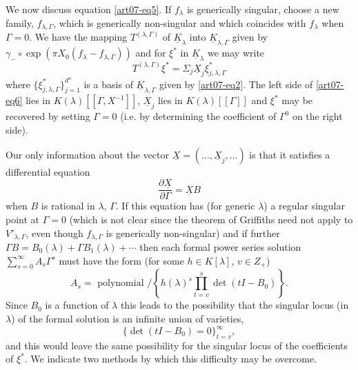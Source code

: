 We now discuss equation \eqref{art07-eq5}. If $f_{\lambda}$ is generically singular, choose a new family, $f_{\lambda,\Gamma}$, which is generically non-singular and which coincides with $f_{\lambda}$ when $\Gamma=0$. We have the mapping $T^{(\lambda,\Gamma)}$ of $\underline{K}_{\lambda}$ into $\underline{K}_{\lambda,\Gamma}$ given by $\gamma_{-}\circ \exp (\pi X_{0}(f_{\lambda}-f_{\lambda,\Gamma}))$ and for $\xi^{*}$ in $\underline{K}_{\lambda}$ we may write
\begin{equation*}
T^{(\lambda,\Gamma)}\xi^{*}=\Sigma_{j}\underline{X}_{j}\xi^{*}_{j,\lambda,\Gamma}\tag{7}\label{art07-eq7}
\end{equation*}
where $\{\xi^{*}_{j,\lambda,\Gamma}\}^{d^{n}}_{j=1}$ is a basis of $\underline{K}_{\lambda,\Gamma}$ given by \eqref{art07-eq2}. The left side of \eqref{art07-eq6} lies in $K(\lambda)[[\Gamma,X^{-1}]]$, $\underline{X}_{j}$ lies in $K(\lambda)[[\Gamma]]$ and $\xi^{*}$ may be recovered by setting $\Gamma=0$ (i.e. by determining the coefficient of $\Gamma^{0}$ on the right side).

Our only information about the vector $\underline{X}=(\ldots,\underline{X}_{j},\ldots)$ is that it satisfies a differential equation
\begin{equation*}
\dfrac{\partial \underline{X}}{\partial \Gamma}=\underline{X}B\tag{8}\label{art07-eq8}
\end{equation*}\pageoriginale
when $B$ is rational in $\lambda$, $\Gamma$. If this equation has (for generic $\lambda$) a regular singular point at $\Gamma=0$ (which is not clear since the theorem of Griffiths need not apply to $V'_{\lambda,\Gamma}$, even though $f_{\lambda,\Gamma}$ is generically non-singular) and if further $\Gamma B=B_{0}(\lambda)+\Gamma B_{1}(\lambda)+\cdots$ then each formal power series solution $\sum\limits^{\infty}_{s=0}A_{s}\Gamma^{s}$ must have the form (for some $h\in K[\lambda]$, $v\in Z_{+}$)
$$
A_{s}=\text{~polynomial~}/\left\{h(\lambda)^{s}\prod\limits^{s}_{t=v}\det (tI-B_{0})\right\}.
$$
Since $B_{0}$ is a function of $\lambda$ this leads to the possibility that the singular locus (in $\lambda$) of the formal solution is an infinite union of varieties,
$$
\{\det (tI-B_{0})=0\}^{\infty}_{t=v},
$$
and this would leave the same possibility for the singular locus of the coefficients of $\xi^{*}$. We indicate two methods by which this difficulty may be overcome.

